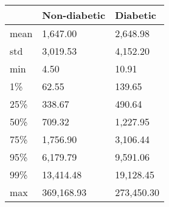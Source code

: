 \begin{tabular}{lll}
\toprule
{} & Non-diabetic &    Diabetic \\
\midrule
mean &     1,647.00 &    2,648.98 \\
std  &     3,019.53 &    4,152.20 \\
min  &         4.50 &       10.91 \\
1\%   &        62.55 &      139.65 \\
25\%  &       338.67 &      490.64 \\
50\%  &       709.32 &    1,227.95 \\
75\%  &     1,756.90 &    3,106.44 \\
95\%  &     6,179.79 &    9,591.06 \\
99\%  &    13,414.48 &   19,128.45 \\
max  &   369,168.93 &  273,450.30 \\
\bottomrule
\end{tabular}
